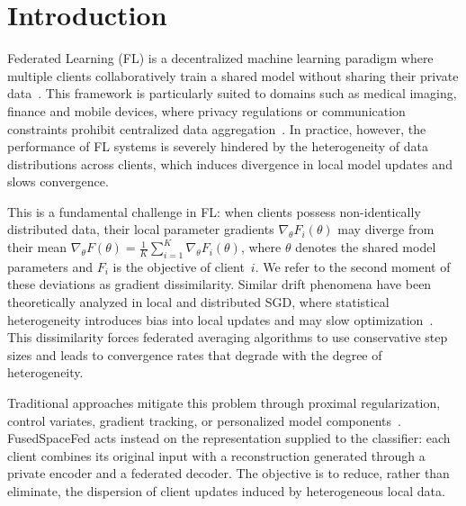 \documentclass[twoside]{article}
\theoremstyle{thmstyleone}%
\theoremstyle{thmstyletwo}%
\theoremstyle{thmstylethree}%
\begin{document}
\section{Introduction}

Federated Learning (FL) is a decentralized machine learning paradigm where multiple clients collaboratively train a shared model without sharing their private data~\cite{mcmahan2017communication}. This framework is particularly suited to domains such as medical imaging, finance and mobile devices, where privacy regulations or communication constraints prohibit centralized data aggregation~\cite{kairouz2021advances}. In practice, however, the performance of FL systems is severely hindered by the heterogeneity of data distributions across clients, which induces divergence in local model updates and slows convergence.

This is a fundamental challenge in FL: when clients possess non-identically distributed data, their local parameter gradients $\nabla_{\theta} F_i(\theta)$ may diverge from their mean $\nabla_{\theta} F(\theta)=\frac{1}{K}\sum_{i=1}^{K}\nabla_{\theta}F_i(\theta)$, where $\theta$ denotes the shared model parameters and $F_i$ is the objective of client~$i$. We refer to the second moment of these deviations as gradient dissimilarity. Similar drift phenomena have been theoretically analyzed in local and distributed SGD, where statistical heterogeneity introduces bias into local updates and may slow optimization~\cite{stich2019localsgd,woodworth2020minibatch}. This dissimilarity forces federated averaging algorithms to use conservative step sizes and leads to convergence rates that degrade with the degree of heterogeneity.

Traditional approaches mitigate this problem through proximal regularization, control variates, gradient tracking, or personalized model components~\cite{li2018federated,karimireddy2020scaffold,haddadpour2021compression,arivazhagan2019fedper,collins2021fedrep,li2021ditto,li2021fedbn}.
FusedSpaceFed acts instead on the representation supplied to the classifier: each client combines its original input with a reconstruction generated through a private encoder and a federated decoder. The objective is to reduce, rather than eliminate, the dispersion of client updates induced by heterogeneous local data.
\end{document}
